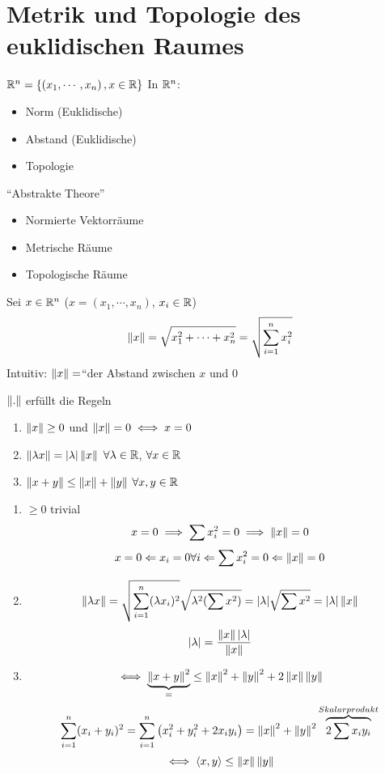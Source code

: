 \section{Metrik und Topologie des euklidischen Raumes}
$\mathbb{R}^n=\left\{ \left( x_1,\cdots,x_n \right), x\in\mathbb{R} \right\}$
In $\mathbb{R}^n$:
\begin{itemize}
  \item Norm (Euklidische)
  \item Abstand (Euklidische)
  \item Topologie
\end{itemize}
``Abstrakte Theore''
\begin{itemize}
  \item Normierte Vektorräume
  \item Metrische Räume
  \item Topologische Räume
\end{itemize}
\begin{Def}
  Sei $x\in\mathbb{R}^n$ ($x=(x_1,\cdots,x_n)$, $x_i\in\mathbb{R}$)
  \[\left\| x \right\|=\sqrt{x_1^2+\cdots+x_n^2}=\sqrt{\sum_{i=1}^nx_i^2}\]
  Intuitiv: $\left\| x \right\|=$``der Abstand zwischen $x$ und 0
\end{Def}
\begin{Lem}
  $\left\| . \right\|$ erfüllt die Regeln
  \begin{enumerate}
    \item $\left\| x \right\|\geq 0$ und $\left\| x \right\|=0\iff x=0$
    \item $\left\| \lambda x \right\|=\mathopen| \lambda \mathclose|\left\| x \right\|$ $\forall \lambda\in\mathbb{R}$, $\forall x\in\mathbb{R}$
    \item $\left\| x+y \right\|\leq\left\| x \right\|+\left\| y \right\|$ $\forall x,y\in\mathbb{R}$
  \end{enumerate}
\end{Lem}
\begin{Bew}
  \begin{enumerate}
    \item $\geq 0$ trivial
      \[x=0\implies \sum x_i^2=0\implies \left\| x \right\|=0\]
      \[x=0\Leftarrow x_i=0 \forall i\Leftarrow \sum x_i^2=0\Leftarrow \left\| x \right\|=0\]
    \item \[\left\| \lambda x \right\|=\sqrt{\sum^n_{i=1}(\lambda x_i)^2}\sqrt{\lambda^2(\sum x^2)}=\mathopen| \lambda \mathclose|\sqrt{\sum x^2}=\mathopen| \lambda \mathclose|\left\| x \right\|\]
      \[\mathopen| \lambda \mathclose|=\frac{\left\| x \right\|\mathopen| \lambda \mathclose|}{\left\| x \right\|}\]
    \item
      \[\iff \underbrace{\left\| x+y \right\|^2}_=\leq \left\| x \right\|^2+\left\| y \right\|^2+2\left\| x \right\|\left\| y \right\|\]
      \[\sum_{i=1}^n(x_i+y_i)^2=\sum_{i=1}^n\left( x_i^2+y_i^2+2x_iy_i \right)=\left\| x \right\|^2+\left\| y \right\|^2\overbrace{2\sum x_iy_i}^{Skalarprodukt}\]
      \[\iff \left< x,y\right>\leq \left\| x \right\|\left\| y \right\|\]
  \end{enumerate}
\end{Bew}
